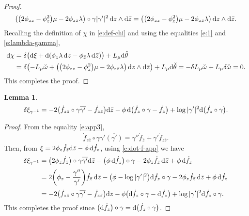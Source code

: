 \documentclass[pdftex]{sigma}%
\numberwithin{equation}{section}
\newtheorem{Lemma}[Theorem]{Lemma}
\begin{document}
\begin{proof}
\begin{gather}\label{e:lambda-gamma}
\big(\big(2\phi_{zz}-\phi^2_z\big)\mu -2\phi_{z\bar{z}} \lambda \big)\circ \gamma |\gamma'|^2\, {\rm d}z\wedge {\rm d}\bar{z} = \big(\big(2\phi_{zz}-\phi^2_z\big)\mu -2\phi_{z\bar{z}} \lambda \big)\, {\rm d}z\wedge {\rm d}\bar{z}.
\end{gather}
Recalling the definition of ${\chi}$ in \eqref{e:def-chi} and using the equalities \eqref{e:1} and \eqref{e:lambda-gamma},
\begin{align*}
{\rm d}\chi &= \delta\big({\rm d}\xi+ {\rm d} (\phi_z \lambda \,{\rm d}z- \phi_{\bar{z}} \lambda\, {\rm d}\bar{z})\big) + L_{\mu}{\rm d}\check{\theta}
\\
&= \delta\big({-}L_\mu \check{\omega}+ \big(\big(2\phi_{zz}-\phi^2_z\big)\mu -2\phi_{z\bar{z}} \lambda \big)\, {\rm d}z\wedge {\rm d}\bar{z}\big)+ L_{\mu}{\rm d}\check{\theta}
= - \delta L_\mu \check{\omega} +L_\mu \delta \check{\omega} =0.
\end{align*}
This completes the proof.
\end{proof}

\begin{Lemma}\label{l:l3}
\begin{gather*}
\delta\xi_{\gamma^{-1}}=-2\big(\dot{f}_{z\bar{z}}\circ\gamma\overline{\gamma'}-\dot{f}_{z\bar{z}}\big){\rm d}\bar{z}-\phi\, {\rm d}\big(\dot{f}_z\circ\gamma-\dot{f}_z\big)+\log|\gamma'|^2 {\rm d}\big(\dot{f}_z\circ\gamma\big).
\end{gather*}
\end{Lemma}

\begin{proof}
From the equality \eqref{e:app3},
\begin{gather}\label{e:dot-f-app}
\dot{f}_{z\bar{z}} \circ \gamma \gamma' \overline{(\gamma')} = \gamma''\dot{f}_{\bar{z}} +\gamma' \dot{f}_{z\bar{z}}.
\end{gather}
Then, from $\xi= 2\phi_z \dot{f}_{\bar{z}} {\rm d}\bar{z} -\phi \,{\rm d}\dot{f}_z$, using \eqref{e:dot-f-app} we have
\begin{align*}
\delta\xi_{\gamma^{-1}} &= \big(2\phi_z \dot{f}_{\bar{z}}\big) \circ \gamma \overline{\gamma'} {\rm d}\bar{z} -\big(\phi \,{\rm d}\dot{f}_z\big)\circ\gamma -2\phi_z\dot{f}_{\bar{z}}\, {\rm d}\bar{z} +\phi\, {\rm d}\dot{f}_z
\\[.5ex]
&=2\bigg( \phi_z -\frac{\gamma''}{\gamma'} \bigg)\dot{f}_{\bar{z}}\, {\rm d}\bar{z} -\big(\phi -\log|\gamma'|^2 \big) {\rm d}\dot{f}_z\circ\gamma - 2\phi_z\dot{f}_{\bar{z}}\, {\rm d}\bar{z} +\phi \,{\rm d}\dot{f}_z
\\[.5ex]
&=-2\big(\dot{f}_{z\bar{z}}\circ\gamma\overline{\gamma'}-\dot{f}_{z\bar{z}}\big){\rm d}\bar{z} -\phi \big( {\rm d}\dot{f}_{z}\circ\gamma - {\rm d}\dot{f}_z \big) + \log|\gamma'|^2 {\rm d}\dot{f}_z\circ\gamma.
\end{align*}
This completes the proof since $\big({\rm d}\dot{f}_z\big)\circ\gamma = {\rm d}\big( \dot{f}_z\circ\gamma\big)$.
\end{proof}
\end{document}
